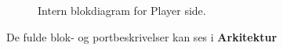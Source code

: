\documentclass[Rapport/Rapport_main.tex]{subfiles}
\begin{document}
\begin{figure}[H]
    \centering
    \caption{Intern blokdiagram for Player side.}
    \label{fig:rap_playerside_hardware_ibd}
\end{figure}
De fulde blok- og portbeskrivelser kan ses i \textbf{Arkitektur} 
\end{document}
